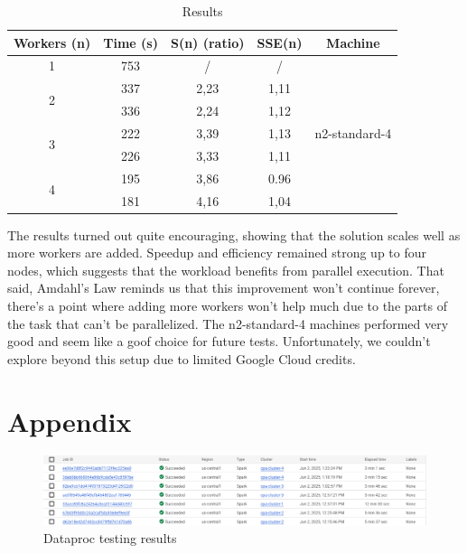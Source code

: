 \documentclass[conference]{IEEEtran}
\begin{document}
\renewcommand{\arraystretch}{1.2}
\begin{table}[htbp]
\caption{Results}
\begin{center}
\begin{tabular}{|c|c|c|c|c|}
\hline
\textbf{Workers (n)}& \textbf{Time (s)}& \textbf{S(n) (ratio)}& \textbf{SSE(n)}& \textbf{Machine}\\
\hline
1& 753& \slash& \slash& \multirow{7}{*}{n2-standard-4} \\
\cline{1-4}
\multirow{2}{*}{2}  & 337& 2,23& 1,11& \\
\cline{2-4}
                    & 336& 2,24& 1,12& \\
\cline{1-4}
\multirow{2}{*}{3}  & 222& 3,39& 1,13& \\
\cline{2-4}
                    & 226& 3,33& 1,11& \\
\cline{1-4}
\multirow{2}{*}{4}  & 195& 3,86& 0.96& \\
\cline{2-4}
                    & 181& 4,16& 1,04& \\
\hline
\end{tabular}
\label{tab:results}
\end{center}
\end{table}

The results turned out quite encouraging, showing that the solution scales well as more workers are added. Speedup and efficiency remained strong up to four nodes, which suggests that the workload benefits from parallel execution. That said, Amdahl’s Law reminds us that this improvement won’t continue forever, there’s a point where adding more workers won’t help much due to the parts of the task that can’t be parallelized. The n2-standard-4 machines performed very good and seem like a goof choice for future tests. Unfortunately, we couldn’t explore beyond this setup due to limited Google Cloud credits.




\section*{Appendix}

\begin{figure}[htpb]
    \centering
    \includegraphics[width=\linewidth]{dataproc-testing.png}
    \caption{Dataproc testing results}
    \label{fig:dataproc-testing}
\end{figure}
\end{document}

